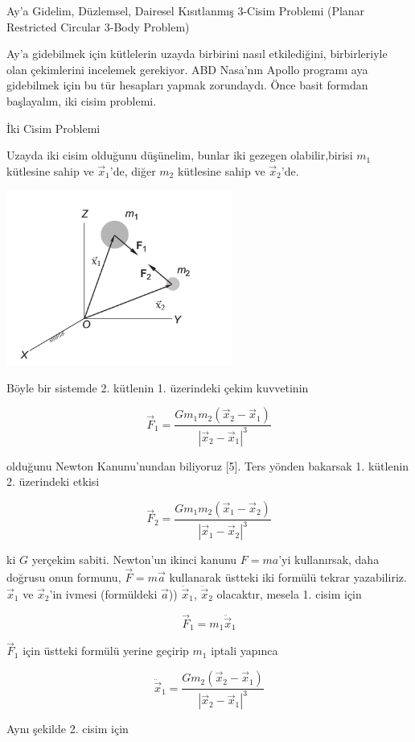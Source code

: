 \documentclass[12pt,fleqn]{article}\usepackage{../../common}
\begin{document}
Ay'a Gidelim, Düzlemsel, Dairesel Kısıtlanmış 3-Cisim Problemi (Planar Restricted Circular 3-Body Problem)

Ay'a gidebilmek için kütlelerin uzayda birbirini nasıl etkilediğini,
birbirleriyle olan çekimlerini incelemek gerekiyor. ABD Nasa'nın Apollo
programı aya gidebilmek için bu tür hesapları yapmak zorundaydı. Önce basit
formdan başlayalım, iki cisim problemi.
 
İki Cisim Problemi

Uzayda iki cisim olduğunu düşünelim, bunlar iki gezegen olabilir,birisi
$m_1$ kütlesine sahip ve $\vec{x}_1$'de, diğer $m_2$ kütlesine sahip ve
$\vec{x}_2$'de.

\includegraphics[width=20em]{chaos_app01_03.png}

Böyle bir sistemde 2. kütlenin 1. üzerindeki çekim kuvvetinin

$$ 
\vec{F}_1 = 
\frac{G m_1 m_2 (\vec{x}_2-\vec{x}_1)  }{ | \vec{x}_2 - \vec{x}_1|^3  }
$$

olduğunu Newton Kanunu'nundan biliyoruz [5]. Ters yönden bakarsak 1. kütlenin
2. üzerindeki etkisi

$$ 
\vec{F}_2 = 
\frac{G m_1 m_2 (\vec{x}_1-\vec{x}_2)  }{ | \vec{x}_1 - \vec{x}_2|^3  }
$$

ki $G$ yerçekim sabiti. Newton'un ikinci kanunu $F=ma$'yi kullanırsak, daha
doğrusu onun formunu, $\vec{F} = m \vec{a}$ kullanarak üstteki iki formülü
tekrar yazabiliriz. $\vec{x}_1$ ve $\vec{x}_2$'in ivmesi (formüldeki
$\vec{a}$)) $\ddot{\vec{x}}_1$, $\ddot{\vec{x}}_2$ olacaktır, mesela
1. cisim için 

$$ \vec{F}_1=  m_1 \ddot{\vec{x}}_1 $$

$\vec{F}_1$  için üstteki formülü yerine geçirip $m_1$ iptali yapınca

$$ \ddot{\vec{x}}_1  = \frac{G m_2 (\vec{x}_2-\vec{x}_1)  }{ | \vec{x}_2 - \vec{x}_1|^3  }$$

Aynı şekilde 2. cisim için
\end{document}
